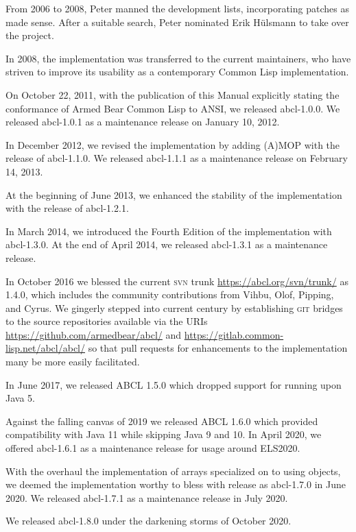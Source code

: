 \documentclass[10pt]{book}
\begin{document}
From 2006 to 2008, Peter manned the development lists, incorporating
patches as made sense.  After a suitable search, Peter nominated Erik
H\"{u}lsmann to take over the project.

In 2008, the implementation was transferred to the current
maintainers, who have striven to improve its usability as a
contemporary Common Lisp implementation.

On October 22, 2011, with the publication of this Manual explicitly
stating the conformance of Armed Bear Common Lisp to \textsc{ANSI}, we
released abcl-1.0.0.  We released abcl-1.0.1 as a maintenance release
on January 10, 2012.

In December 2012, we revised the implementation by adding
\textsc{(A)MOP} with the release of abcl-1.1.0.  We released
abcl-1.1.1 as a maintenance release on February 14, 2013.

At the beginning of June 2013, we enhanced the stability of the
implementation with the release of abcl-1.2.1.

In March 2014, we introduced the Fourth Edition of the implementation
with abcl-1.3.0.  At the end of April 2014, we released abcl-1.3.1 as
a maintenance release.

In October 2016 we blessed the current \textsc{svn} trunk
\url{https://abcl.org/svn/trunk/} as 1.4.0, which includes the
community contributions from Vihbu, Olof, Pipping, and Cyrus.  We
gingerly stepped into current century by establishing \textsc{git}
bridges to the source repositories available via the URIs
\url{https://github.com/armedbear/abcl/} and
\url{https://gitlab.common-lisp.net/abcl/abcl/} so that pull requests
for enhancements to the implementation many be more easily
facilitated.

In June 2017, we released ABCL 1.5.0 which dropped support for running
upon Java 5.

Against the falling canvas of 2019 we released ABCL 1.6.0 which
provided compatibility with Java 11 while skipping Java 9 and 10.  In
April 2020, we offered abcl-1.6.1 as a maintenance release for usage
around ELS2020.

With the overhaul the implementation of arrays specialized on
 to
using  objects, we deemed the implementation
worthy to bless with release as abcl-1.7.0 in June 2020.  We released
abcl-1.7.1 as a maintenance release in July 2020.

We released abcl-1.8.0 under the darkening storms of October 2020.
\end{document}
